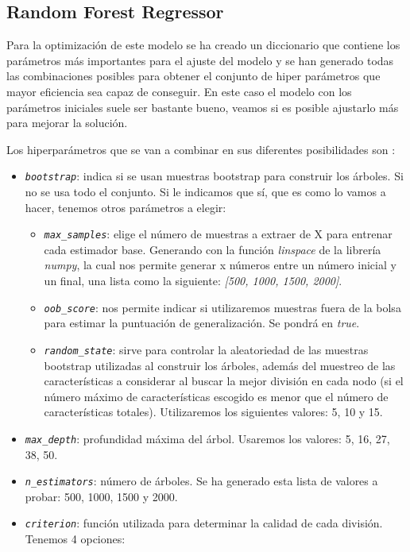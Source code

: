 \subsection{Random Forest Regressor}
Para la optimización de este modelo se ha creado un diccionario que contiene los parámetros más importantes para el ajuste del modelo y se han generado todas las combinaciones posibles para obtener el conjunto de hiper parámetros que mayor eficiencia sea capaz de conseguir. En este caso el modelo con los parámetros iniciales suele ser bastante bueno, veamos si es posible ajustarlo más para mejorar la solución.

Los hiperparámetros que se van a combinar en sus diferentes posibilidades son \cite{sklearn:randomforestregressor}:
\begin{itemize}
    \item \texttt{\textit{bootstrap}}: indica si se usan muestras bootstrap para construir los árboles. Si no se usa todo el conjunto. Si le indicamos que sí, que es como lo vamos a hacer, tenemos otros parámetros a elegir:
        \begin{itemize}
            \item \texttt{\textit{max\_samples}}: elige el número de muestras a extraer de X para entrenar cada estimador base. Generando con la función \textit{linspace} de la librería \textit{numpy}, la cual nos permite generar x números entre un número inicial y un final, una lista como la siguiente: \textit{[500, 1000, 1500, 2000]}.
            \item \texttt{\textit{oob\_score}}: nos permite indicar si utilizaremos muestras fuera de la bolsa para estimar la puntuación de generalización. Se pondrá en \textit{true}.
            \item \texttt{\textit{random\_state}}: sirve para controlar la aleatoriedad de las muestras bootstrap utilizadas al construir los árboles, además del muestreo de las características a considerar al buscar la mejor división en cada nodo (si el número máximo de características escogido es menor que el número de características totales). Utilizaremos los siguientes valores: 5, 10 y 15.
        \end{itemize}
    \item \texttt{\textit{max\_depth}}: profundidad máxima del árbol. Usaremos los valores:  5, 16, 27, 38, 50.
    \item \texttt{\textit{n\_estimators}}: número de árboles. Se ha generado esta lista de valores a probar: 500, 1000, 1500 y 2000.
    \item \texttt{\textit{criterion}}: función utilizada para determinar la calidad de cada división. Tenemos 4 opciones:

\end{itemize}
